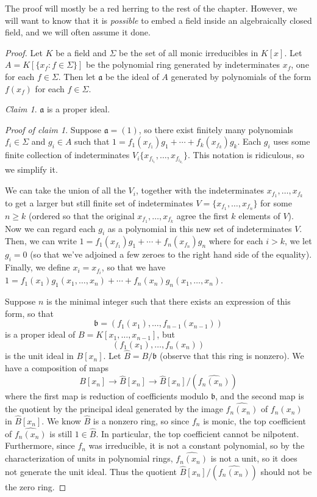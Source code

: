 The proof will mostly be a red herring to the rest of the chapter. However, we
will want to know that it is \emph{possible} to embed a field inside an
algebraically closed field, and we will often assume it done.
\begin{proof}
Let $ K$ be a field and $ \Sigma$ be the set of all monic irreducibles in $ K[x]$. Let $ A = K[\{x_f : f \in \Sigma\}]$ be the polynomial ring generated by indeterminates $ x_f$, one for each $ f \in \Sigma$. Then let $ \mathfrak{a}$ be the ideal of $ A$ generated by polynomials of the form $ f(x_f)$ for each $ f \in \Sigma$.

\emph{Claim 1}. $ \mathfrak{a}$ is a proper ideal.

\emph{Proof of claim 1}. Suppose $ \mathfrak{a} = (1)$, so there exist finitely many polynomials $ f_i \in \Sigma$ and $ g_i \in A$ such that $ 1 = f_1(x_{f_1}) g_1 + \dotsb + f_k(x_{f_k}) g_k$. Each $ g_i$ uses some finite collection of indeterminates $ V_i \{x_{f_{i_1}}, \dotsc, x_{f_{i_{k_i}}}\}$. This notation is ridiculous, so we simplify it.

We can take the union of all the $ V_i$, together with the indeterminates $ x_{f_1}, \dotsc, x_{f_k}$ to get a larger but still finite set of indeterminates $ V = \{x_{f_1}, \dotsc, x_{f_n}\}$ for some $ n \geq k$ (ordered so that the original $ x_{f_1}, \dotsc, x_{f_k}$ agree the first $ k$ elements of $ V$). Now we can regard each $ g_i$ as a polynomial in this new set of indeterminates $ V$.
Then, we can write $ 1 = f_1(x_{f_1}) g_1 + \dotsb + f_n(x_{f_n}) g_n$ where for each $ i > k$, we let $ g_i = 0$ (so that we've adjoined a few zeroes to the right hand side of the equality).
Finally, we define $ x_i = x_{f_i}$, so that we have
$ 1 = f_1(x_1)g_1(x_1, \dotsc, x_n) + \dotsb + f_n(x_n) g_n(x_1, \dotsc, x_n)$.

Suppose $ n$ is the minimal integer such that there exists an expression of this form, so that
\[ \mathfrak{b} = (f_1(x_1), \dotsc, f_{n-1}(x_{n-1})) \]
is a proper ideal of $ B = K[x_1, \dotsc, x_{n-1}]$, but
\[ (f_1(x_1), \dotsc, f_n(x_n)) \]
is the unit ideal in $ B[x_n]$. Let $ \hat{B} = B/\mathfrak{b}$ (observe that this ring is nonzero). We have a composition of maps
\[ B[x_n] \to \hat{B}[x_n] \to \hat{B}[x_n]/(\widehat{f_n(x_n)}) \]
where the first map is reduction of coefficients modulo $ \mathfrak{b}$, and the second map is the quotient by the principal ideal generated by the image $ \widehat{f_n(x_n)}$ of $ f_n(x_n)$ in $ \hat{B}[x_n]$. We know $ \hat{B}$ is a nonzero ring, so since $ f_n$ is monic, the top coefficient of $ \widehat{f_n(x_n)}$ is still $ 1 \in \hat{B}$. In particular, the top coefficient cannot be nilpotent. Furthermore, since $ f_n$ was irreducible, it is not a constant polynomial, so by the characterization of units in polynomial rings, $ \widehat{f_n(x_n)}$ is not a unit, so it does not generate the unit ideal. Thus the quotient $ \hat{B}[x_n]/(\widehat{f_n(x_n)})$ should not be the zero ring.


\end{proof}
